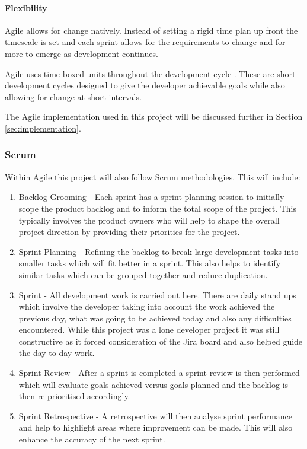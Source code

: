 \paragraph{Flexibility} Agile allows for change natively. Instead of setting a rigid time plan up front the timescale is set and each \gls{sprint} allows for the requirements to change and for more to emerge as development continues.

Agile uses time-boxed units throughout the development cycle \citep{Agile2016}. These are short development cycles designed to give the developer achievable goals while also allowing for change at short intervals.

The Agile implementation used in this project will be discussed further in Section \ref{sec:implementation}.

\subsubsection{Scrum}
Within Agile this project will also follow \gls{Scrum} methodologies. This will include:

\begin{enumerate}
	\item Backlog Grooming - Each \gls{sprint} has a \gls{sprint} planning session to initially scope the product \gls{backlog} and to inform the total scope of the project. This typically involves the product owners who will help to shape the overall project direction by providing their priorities for the project.
	\item Sprint Planning - Refining the \gls{backlog} to break large development tasks into smaller tasks which will fit better in a \gls{sprint}. This also helps to identify similar tasks which can be grouped together and reduce duplication.
	\item Sprint - All development work is carried out here. There are daily stand ups which involve the developer taking into account the work achieved the previous day, what was going to be achieved today and also any difficulties encountered. While this project was a lone developer project it was still constructive as it forced consideration of the Jira board and also helped guide the day to day work.
	\item Sprint Review - After a \gls{sprint} is completed a \gls{sprint} review is then performed which will evaluate goals achieved versus goals planned and the \gls{backlog} is then re-prioritised accordingly.
	\item Sprint Retrospective - A retrospective will then analyse \gls{sprint} performance and help to highlight areas where improvement can be made. This will also enhance the accuracy of the next \gls{sprint}.
\end{enumerate}

